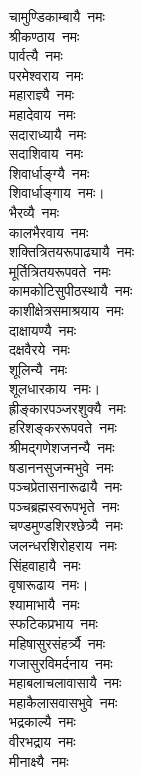 \begin{multicols}{2}
\begin{flushleft}
चामुण्डिकाम्बायै~नमः\\
श्रीकण्ठाय~नमः\\
पार्वत्यै~नमः\\
परमेश्वराय~नमः\\
महाराज्ञ्यै~नमः\\
महादेवाय~नमः\\
सदाराध्यायै~नमः\\
सदाशिवाय~नमः\\
शिवार्धाङ्ग्यै~नमः\\
शिवार्धाङ्गाय~नमः।\hfill{}\\
भैरव्यै~नमः\\
कालभैरवाय~नमः\\
शक्तित्रितयरूपाढ्यायै~नमः\\
मूर्तित्रितयरूपवते~नमः\\
कामकोटिसुपीठस्थायै~नमः\\
काशीक्षेत्रसमाश्रयाय~नमः\\
दाक्षायण्यै~नमः\\
दक्षवैरये~नमः\\
शूलिन्यै~नमः\\
शूलधारकाय~नमः।\hfill{}\\
ह्रीङ्कारपञ्जरशुक्यै~नमः\\
हरिशङ्कररूपवते~नमः\\
श्रीमद्गणेशजनन्यै~नमः\\
षडाननसुजन्मभुवे~नमः\\
पञ्चप्रेतासनारूढायै~नमः\\
पञ्चब्रह्मस्वरूपभृते~नमः\\
चण्डमुण्डशिरश्छेत्र्यै~नमः\\
जलन्धरशिरोहराय~नमः\\
सिंहवाहायै~नमः\\
वृषारूढाय~नमः।\hfill{}\\
श्यामाभायै~नमः\\
स्फटिकप्रभाय~नमः\\
महिषासुरसंहर्त्र्यै~नमः\\
गजासुरविमर्दनाय~नमः\\
महाबलाचलावासायै~नमः\\
महाकैलासवासभुवे~नमः\\
भद्रकाल्यै~नमः\\
वीरभद्राय~नमः\\
मीनाक्ष्यै~नमः\\

\end{flushleft}
\end{multicols}
